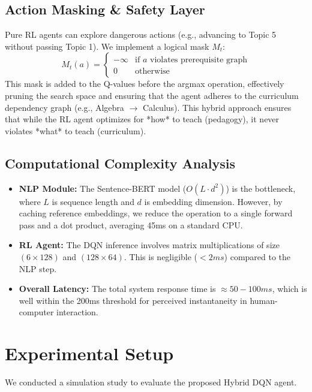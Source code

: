 \documentclass[conference]{IEEEtran}
\begin{document}
\subsection{Action Masking \& Safety Layer}
Pure RL agents can explore dangerous actions (e.g., advancing to Topic 5 without passing Topic 1). We implement a logical mask $M_t$:
\begin{equation}
M_t(a) = \begin{cases} -\infty & \text{if } a \text{ violates prerequisite graph} \\ 0 & \text{otherwise} \end{cases}
\end{equation}
This mask is added to the Q-values before the argmax operation, effectively pruning the search space and ensuring that the agent adheres to the curriculum dependency graph (e.g., Algebra $\rightarrow$ Calculus). This hybrid approach ensures that while the RL agent optimizes for *how* to teach (pedagogy), it never violates *what* to teach (curriculum).

\subsection{Computational Complexity Analysis}
\begin{itemize}
    \item \textbf{NLP Module:} The Sentence-BERT model ($O(L \cdot d^2)$) is the bottleneck, where $L$ is sequence length and $d$ is embedding dimension. However, by caching reference embeddings, we reduce the operation to a single forward pass and a dot product, averaging 45ms on a standard CPU.
    \item \textbf{RL Agent:} The DQN inference involves matrix multiplications of size $(6 \times 128)$ and $(128 \times 64)$. This is negligible ($< 2ms$) compared to the NLP step.
    \item \textbf{Overall Latency:} The total system response time is $\approx 50-100ms$, which is well within the 200ms threshold for perceived instantaneity in human-computer interaction.
\end{itemize}

\section{Experimental Setup}
We conducted a simulation study to evaluate the proposed Hybrid DQN agent.
\end{document}
